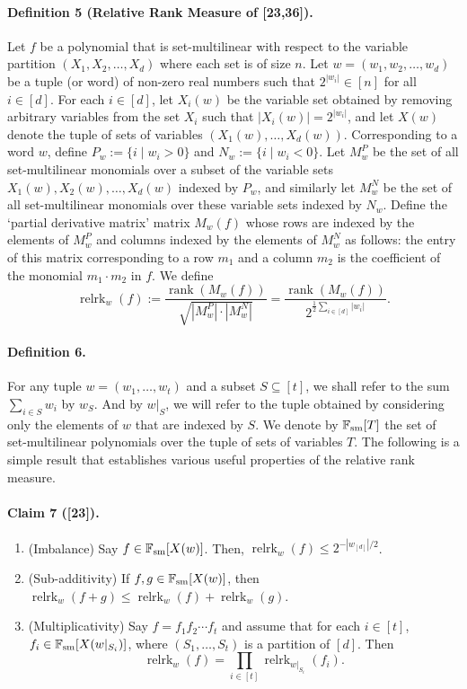 \documentclass[10pt,a4paper]{article}
\begin{document}
\paragraph{Definition 5 (Relative Rank Measure of [23,36]).} Let $f$ be a polynomial that is set-multilinear with respect to the variable partition $(X_1,X_2,\ldots,X_d)$ where each set is of size $n$. Let $w=(w_1,w_2,\ldots,w_d)$ be a tuple (or word) of non-zero real numbers such that $2^{|w_i|}\in[n]$ for all $i\in[d]$. For each $i\in[d]$, let $X_i(w)$ be the variable set obtained by removing arbitrary variables from the set $X_i$ such that $|X_i(w)|=2^{|w_i|}$, and let $X(w)$ denote the tuple of sets of variables $(X_1(w),\ldots,X_d(w))$. Corresponding to a word $w$, define $P_w:=\{i\mid w_i>0\}$ and $N_w:=\{i\mid w_i<0\}$. Let $M_w^P$ be the set of all set-multilinear monomials over a subset of the variable sets $X_1(w),X_2(w),\ldots,X_d(w)$ indexed by $P_w$, and similarly let $M_w^N$ be the set of all set-multilinear monomials over these variable sets indexed by $N_w$.
Define the `partial derivative matrix' matrix $M_w(f)$ whose rows are indexed by the elements of $M_w^P$ and columns indexed by the elements of $M_w^N$ as follows: the entry of this matrix corresponding to a row $m_1$ and a column $m_2$ is the coefficient of the monomial $m_1\cdot m_2$ in $f$. We define
\[\operatorname{relrk}_w(f):=\frac{\operatorname{rank}(M_w(f))}{\sqrt{|M_w^P|\cdot|M_w^N|}}=\frac{\operatorname{rank}(M_w(f))}{2^{\frac12\sum_{i\in[d]}|w_i|}}.\]
\paragraph{Definition 6.} For any tuple $w=(w_1,\ldots,w_t)$ and a subset $S\subseteq[t]$, we shall refer to the sum $\sum_{i\in S}w_i$ by $w_S$. And by $w|_S$, we will refer to the tuple obtained by considering only the elements of $w$ that are indexed by $S$. We denote by $\mathbb F_{\rm sm}[T]$ the set of set-multilinear polynomials over the tuple of sets of variables $T$.
The following is a simple result that establishes various useful properties of the relative rank measure.
\paragraph{Claim 7 ([23]).}
\begin{enumerate}
\item (Imbalance) Say $f\in\mathbb F_{\rm sm}[X(w)]$. Then, $\operatorname{relrk}_w(f)\leq2^{-|w_{[d]}|/2}$.
\item (Sub-additivity) If $f,g\in\mathbb F_{\rm sm}[X(w)]$, then $\operatorname{relrk}_w(f+g)\leq\operatorname{relrk}_w(f)+\operatorname{relrk}_w(g)$.
\item (Multiplicativity) Say $f=f_1f_2\cdots f_t$ and assume that for each $i\in[t]$, $f_i\in\mathbb F_{\rm sm}[X(w|_{S_i})]$, where $(S_1,\ldots,S_t)$ is a partition of $[d]$. Then
\[\operatorname{relrk}_w(f)=\prod_{i\in[t]}\operatorname{relrk}_{w|_{S_i}}(f_i).\]
\end{enumerate}
\end{document}
